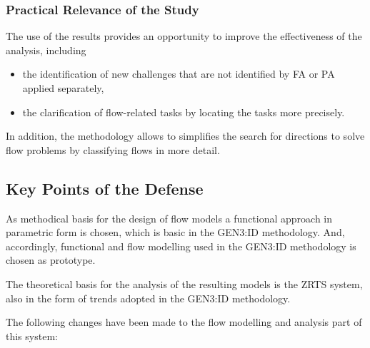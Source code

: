 \documentclass[a4paper,11pt]{article}
\begin{document}
\subsubsection{Practical Relevance of the Study}

The use of the results provides an opportunity to improve the effectiveness of
the analysis, including
\begin{itemize}
\item the identification of new challenges that are not identified by FA or PA
  applied separately,
\item the clarification of flow-related tasks by locating the tasks more
  precisely.
\end{itemize}
In addition, the methodology allows to simplifies the search for directions to
solve flow problems by classifying flows in more detail.

\subsection{Key Points of the Defense}

As methodical basis for the design of flow models a functional approach in
parametric form is chosen, which is basic in the GEN3:ID methodology. And,
accordingly, functional and flow modelling used in the GEN3:ID methodology is
chosen as prototype.

The theoretical basis for the analysis of the resulting models is the ZRTS
system, also in the form of trends adopted in the GEN3:ID methodology.

The following changes have been made to the flow modelling and analysis part
of this system:
\end{document}
